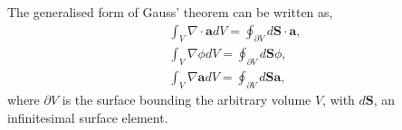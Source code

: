 \documentclass[final,3p,times,twocolumn]{elsarticle}
\begin{document}
The generalised form of Gauss' theorem can be written as,
\begin{gather}
    \int_V \nabla \cdot \mathbf{a} dV = \oint_{\partial V} d\mathbf{S} \cdot \mathbf{a} , 
    \label{eqn:gauss1}
    \\
    \int_V \nabla \phi dV = \oint_{\partial V} d\mathbf{S} \phi , 
    \label{eqn:gauss2}
    \\
    \int_V \nabla \mathbf{a} dV = \oint_{\partial V} d\mathbf{S} \mathbf{a} , 
    \label{eqn:gauss3}
\end{gather}
where $\partial V$ is the surface bounding the arbitrary volume $V$, with $d\mathbf{S}$, an infinitesimal surface element.






\newpage








\end{document}
